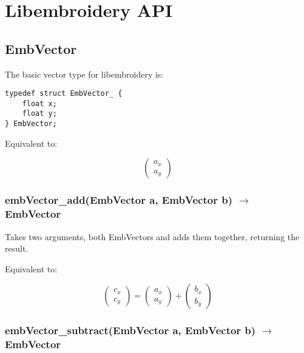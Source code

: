 
\chapter{Libembroidery API}

\section{EmbVector}

The basic vector type for libembroidery is:

\begin{lstlisting}
typedef struct EmbVector_ {
    float x;
    float y;
} EmbVector;
\end{lstlisting}

Equivalent to:

\begin{equation}
    \begin{pmatrix}
    a_x \\ a_y
    \end{pmatrix}
\end{equation}

\subsection{embVector\_add(EmbVector a, EmbVector b) $\to$ EmbVector}

Takes two arguments, both EmbVectors and adds them together, returning the result.

Equivalent to:

\begin{equation}
    \begin{pmatrix}
    c_x \\ c_y
    \end{pmatrix} =
    \begin{pmatrix}
    a_x \\ a_y
    \end{pmatrix} +
    \begin{pmatrix}
    b_x \\ b_y
    \end{pmatrix}
\end{equation}

\subsection{embVector\_subtract(EmbVector a, EmbVector b) $\to$ EmbVector}

